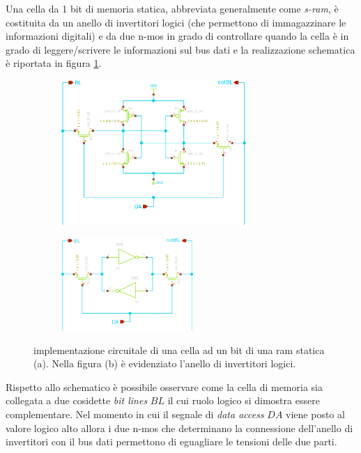 	\vspace{5mm}
	
	Una cella da 1 bit di memoria statica, abbreviata generalmente come \textit{s-ram}, è costituita da un anello di invertitori logici (che permettono di immagazzinare le informazioni digitali) e da due n-mos in grado di controllare quando la cella è in grado di leggere/scrivere le informazioni sul bus dati e la realizzazione schematica è riportata in figura \ref{fig:sram:sch}.
	
	\begin{figure}[bht]
		\centering
		\begin{subfigure}{0.48\linewidth}
			\centering
			\includegraphics[width=7cm]{Immagini/sram-1bit}
			\caption{}
		\end{subfigure}
		\begin{subfigure}{0.48\linewidth}
			\centering
			\includegraphics[width=5cm]{Immagini/sram-1bit-simple}
			\caption{}
		\end{subfigure}
		\caption{implementazione circuitale di una cella ad un bit di una ram statica (a). Nella figura (b) è evidenziato l'anello di invertitori logici.}
		\label{fig:sram:sch}
	\end{figure}

	Rispetto allo schematico è possibile osservare come la cella di memoria sia collegata a due cosidette \textit{bit lines} $BL$ il cui ruolo logico si dimostra essere complementare. Nel momento in cui il segnale di \textit{data access} $DA$ viene posto al valore logico alto allora i due n-mos che determinano la connessione dell'anello di invertitori con il bus dati permettono di eguagliare le tensioni delle due parti.
	
